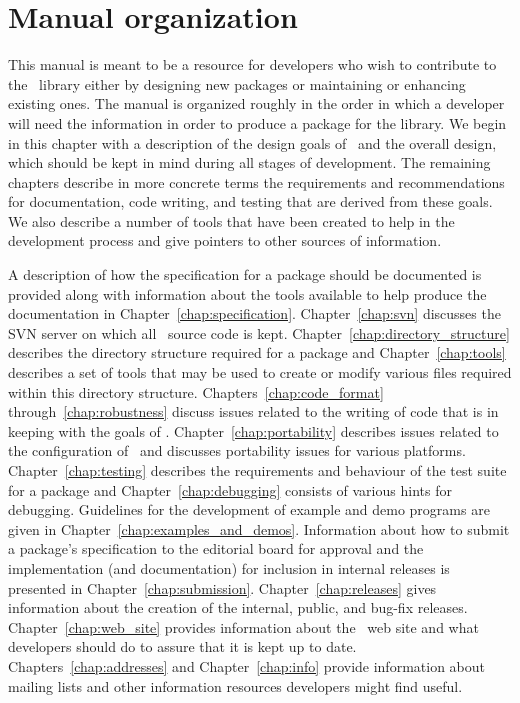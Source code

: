 \section{Manual organization}
\label{sec:manual_org}

This manual is meant to be a resource for developers who wish to contribute
to the \cgal\ library either by designing new packages or maintaining
or enhancing existing ones. The manual is organized roughly in the order in
which a developer will need the information in order to produce a package
for the library. We begin in this chapter with a description
of the design goals of \cgal\ and the overall design, which should be kept
in mind during all stages of development.  The remaining chapters describe
in more concrete terms the requirements and recommendations for documentation,
code writing, and testing that are derived from these goals.  We also describe
a number of tools that have been created to help in the development process
and give pointers to other sources of information.

A description of how the specification
for a package should be documented is provided along with information about
the tools available to help produce the documentation
in Chapter~\ref{chap:specification}.
Chapter~\ref{chap:svn} discusses the SVN server on which all \cgal\ source
code is kept.
Chapter~\ref{chap:directory_structure} describes the directory structure
required for a package and Chapter~\ref{chap:tools} describes a set of tools
that may be used to create or modify various files required within this
directory structure. Chapters~\ref{chap:code_format}
through~\ref{chap:robustness}
discuss issues related to the writing of code that is in keeping with
the goals of \cgal.  Chapter~\ref{chap:portability} describes issues
related to the configuration of \cgal\ and
discusses portability issues for various platforms. Chapter~\ref{chap:testing}
describes the requirements and behaviour of the test suite for a package and
Chapter~\ref{chap:debugging} consists of various hints for debugging.
Guidelines for the development of example and demo programs are given in
Chapter~\ref{chap:examples_and_demos}. Information
about how to submit a package's specification to the editorial board
for approval and the implementation (and documentation) for inclusion in
internal releases is presented in  Chapter~\ref{chap:submission}.
Chapter~\ref{chap:releases} gives information about the creation of the
internal, public, and bug-fix releases.  Chapter~\ref{chap:web_site}
provides information about the \cgal\ web site and what developers should
do to assure that it is kept up to date.
Chapters~\ref{chap:addresses} and Chapter~\ref{chap:info}
provide information about mailing lists and other information
resources developers might find useful.
